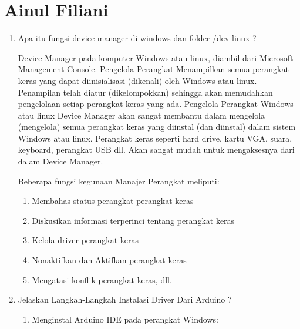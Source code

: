 \section{Ainul Filiani}
\begin{enumerate}
\item Apa itu fungsi device manager di windows dan folder /dev linux ?

Device Manager pada komputer Windows atau linux, diambil dari Microsoft Management Console. Pengelola Perangkat Menampilkan semua perangkat keras yang dapat diinisialisasi (dikenali) oleh Windows atau linux. Penampilan telah diatur (dikelompokkan) sehingga akan memudahkan pengelolaan setiap perangkat keras yang ada.
Pengelola Perangkat Windows atau linux
Device Manager akan sangat membantu dalam mengelola (mengelola) semua perangkat keras yang diinstal (dan diinstal) dalam sistem Windows atau linux. Perangkat keras seperti hard drive, kartu VGA, suara, keyboard, perangkat USB dll. Akan sangat mudah untuk mengaksesnya dari dalam Device Manager.

Beberapa fungsi kegunaan Manajer Perangkat meliputi:
\begin{enumerate}
\item Membahas status perangkat perangkat keras
\item Diskusikan informasi terperinci tentang perangkat keras
\item Kelola driver perangkat keras
\item Nonaktifkan dan Aktifkan perangkat keras
\item Mengatasi konflik perangkat keras, dll.
\end{enumerate}

\item Jelaskan Langkah-Langkah Instalasi Driver Dari Arduino ?

\begin{enumerate}
\item Menginstal Arduino IDE pada perangkat Windows: 


\end{enumerate}
\end{enumerate}
